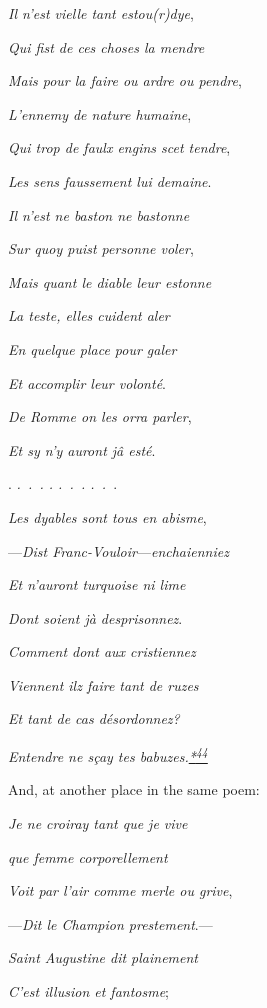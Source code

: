 \emph{Il n'est vielle tant estou(r)dye},

\emph{Qui fist de ces choses la mendre}

\emph{Mais pour la faire ou ardre ou pendre},

\emph{L'ennemy de nature humaine},

\emph{Qui trop de faulx engins scet tendre},

\emph{Les sens faussement lui demaine}.

\emph{Il n'est ne baston ne bastonne}

\emph{Sur quoy puist personne voler},

\emph{Mais quant le diable leur estonne}

\emph{La teste, elles cuident aler}

\emph{En quelque place pour galer}

\emph{Et accomplir leur volonté}.

\emph{De Romme on les orra parler},

\emph{Et sy n'y auront jâ esté}.

. \emph{.~.~. . .~.~. .~.~}.

\emph{Les dyables sont tous en abisme},

---\emph{Dist Franc-Vouloir}---\emph{enchaienniez}

\emph{Et n'auront turquoise ni lime}

\emph{Dont soient jà desprisonnez}.

\emph{Comment dont aux cristiennez}

\emph{Viennent ilz faire tant de ruzes}

\emph{\protect\hypertarget{18_Chapter_Eleven__THE_FORMS_OF_THO.xhtmlux5cux23page_291}{}{}Et
tant de cas désordonnez?}

\emph{Entendre ne sçay tes
babuzes.\protect\hypertarget{18_Chapter_Eleven__THE_FORMS_OF_THO.xhtmlux5cux23id_2649}{\protect\hyperlink{23_NOTES.xhtmlux5cux23id_2650}{*\textsuperscript{44}}}}

And, at another place in the same poem:

\emph{Je ne croiray tant que je vive}

\emph{que femme corporellement}

\emph{Voit par l'air comme merle ou grive},

---\emph{Dit le Champion prestement}.---

\emph{Saint Augustine dit plainement}

\emph{C'est illusion et fantosme};


